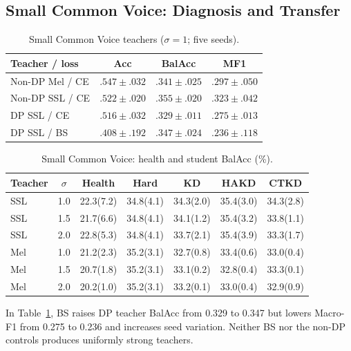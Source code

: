 \subsection{Small Common Voice: Diagnosis and Transfer}
\label{sec:cv_main_results}

\begin{table}[t]
\centering
\caption{Small Common Voice teachers ($\sigma=1$; five seeds).}
\label{tab:cv_accent_baseline_dp_loss}
\scriptsize\setlength{\tabcolsep}{3pt}
\begin{tabular}{lccc}
\toprule
Teacher / loss & Acc & BalAcc & MF1\\
\midrule
Non-DP Mel / CE & $.547\pm.032$ & $.341\pm.025$ & $.297\pm.050$\\
Non-DP SSL / CE & $.522\pm.020$ & $.355\pm.020$ & $.323\pm.042$\\
DP SSL / CE & $.516\pm.032$ & $.329\pm.011$ & $.275\pm.013$\\
DP SSL / BS & $.408\pm.192$ & $.347\pm.024$ & $.236\pm.118$\\
\bottomrule
\end{tabular}
\end{table}

\begin{table}[t]
\centering
\caption{Small Common Voice: health and student BalAcc (\%).}
\label{tab:cv_release_routing}
\scriptsize\setlength{\tabcolsep}{2pt}
\begin{tabular}{lcccccc}
\toprule
Teacher & $\sigma$ & Health & Hard & KD & HAKD & CTKD\\
\midrule
SSL & 1.0 & 22.3(7.2) & 34.8(4.1) & 34.3(2.0) & 35.4(3.0) & 34.3(2.8)\\
SSL & 1.5 & 21.7(6.6) & 34.8(4.1) & 34.1(1.2) & 35.4(3.2) & 33.8(1.1)\\
SSL & 2.0 & 22.8(5.3) & 34.8(4.1) & 33.7(2.1) & 35.4(3.9) & 33.3(1.7)\\
\midrule
Mel & 1.0 & 21.2(2.3) & 35.2(3.1) & 32.7(0.8) & 33.4(0.6) & 33.0(0.4)\\
Mel & 1.5 & 20.7(1.8) & 35.2(3.1) & 33.1(0.2) & 32.8(0.4) & 33.3(0.1)\\
Mel & 2.0 & 20.2(1.0) & 35.2(3.1) & 33.2(0.1) & 33.0(0.4) & 32.9(0.9)\\
\bottomrule
\end{tabular}
\end{table}

In Table~\ref{tab:cv_accent_baseline_dp_loss}, BS raises DP teacher BalAcc from 0.329 to 0.347 but lowers Macro-F1 from 0.275 to 0.236 and increases seed variation. Neither BS nor the non-DP controls produces uniformly strong teachers.

